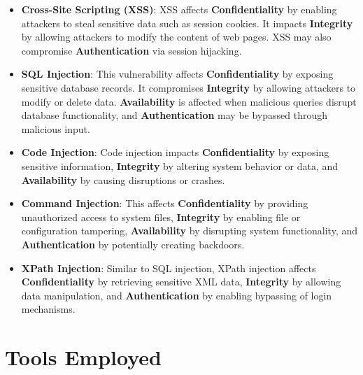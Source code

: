 \documentclass{article}
\begin{document}
\begin{itemize}
    \item \textbf{Cross-Site Scripting (XSS)}: 
    XSS affects \textbf{Confidentiality} by enabling attackers to steal sensitive data such as session cookies. It impacts \textbf{Integrity} by allowing attackers to modify the content of web pages. XSS may also compromise \textbf{Authentication} via session hijacking.

    \item \textbf{SQL Injection}: 
    This vulnerability affects \textbf{Confidentiality} by exposing sensitive database records. It compromises \textbf{Integrity} by allowing attackers to modify or delete data. \textbf{Availability} is affected when malicious queries disrupt database functionality, and \textbf{Authentication} may be bypassed through malicious input.

    \item \textbf{Code Injection}: 
    Code injection impacts \textbf{Confidentiality} by exposing sensitive information, \textbf{Integrity} by altering system behavior or data, and \textbf{Availability} by causing disruptions or crashes.

    \item \textbf{Command Injection}: 
    This affects \textbf{Confidentiality} by providing unauthorized access to system files, \textbf{Integrity} by enabling file or configuration tampering, \textbf{Availability} by disrupting system functionality, and \textbf{Authentication} by potentially creating backdoors.

    \item \textbf{XPath Injection}: 
    Similar to SQL injection, XPath injection affects \textbf{Confidentiality} by retrieving sensitive XML data, \textbf{Integrity} by allowing data manipulation, and \textbf{Authentication} by enabling bypassing of login mechanisms.
\end{itemize}

\section{Tools Employed}
\label{}
\end{document}
